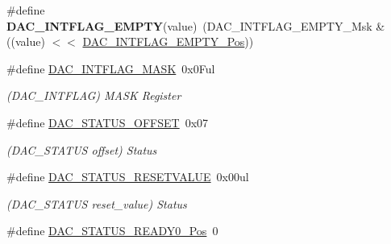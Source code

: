 \begin{DoxyCompactItemize}
\item 
\hypertarget{group___s_a_m_l21___d_a_c_ga7da99f63d5a2d03f99681a95f9b793a0}{}\#define {\bfseries D\+A\+C\+\_\+\+I\+N\+T\+F\+L\+A\+G\+\_\+\+E\+M\+P\+T\+Y}(value)~(D\+A\+C\+\_\+\+I\+N\+T\+F\+L\+A\+G\+\_\+\+E\+M\+P\+T\+Y\+\_\+\+Msk \& ((value) $<$$<$ \hyperlink{group___s_a_m_l21___d_a_c_ga0dac29b106d18582f439752a01102763}{D\+A\+C\+\_\+\+I\+N\+T\+F\+L\+A\+G\+\_\+\+E\+M\+P\+T\+Y\+\_\+\+Pos}))\label{group___s_a_m_l21___d_a_c_ga7da99f63d5a2d03f99681a95f9b793a0}

\item 
\hypertarget{group___s_a_m_l21___d_a_c_ga7610b49b2915578cf29db233149cf421}{}\#define \hyperlink{group___s_a_m_l21___d_a_c_ga7610b49b2915578cf29db233149cf421}{D\+A\+C\+\_\+\+I\+N\+T\+F\+L\+A\+G\+\_\+\+M\+A\+S\+K}~0x0\+Ful\label{group___s_a_m_l21___d_a_c_ga7610b49b2915578cf29db233149cf421}

\begin{DoxyCompactList}\small\item\em (D\+A\+C\+\_\+\+I\+N\+T\+F\+L\+A\+G) M\+A\+S\+K Register \end{DoxyCompactList}\item 
\hypertarget{group___s_a_m_l21___d_a_c_ga515f997330d2406b1230c8b83e7c5a6b}{}\#define \hyperlink{group___s_a_m_l21___d_a_c_ga515f997330d2406b1230c8b83e7c5a6b}{D\+A\+C\+\_\+\+S\+T\+A\+T\+U\+S\+\_\+\+O\+F\+F\+S\+E\+T}~0x07\label{group___s_a_m_l21___d_a_c_ga515f997330d2406b1230c8b83e7c5a6b}

\begin{DoxyCompactList}\small\item\em (D\+A\+C\+\_\+\+S\+T\+A\+T\+U\+S offset) Status \end{DoxyCompactList}\item 
\hypertarget{group___s_a_m_l21___d_a_c_ga114959003f1b29d6a60514c7e42781e3}{}\#define \hyperlink{group___s_a_m_l21___d_a_c_ga114959003f1b29d6a60514c7e42781e3}{D\+A\+C\+\_\+\+S\+T\+A\+T\+U\+S\+\_\+\+R\+E\+S\+E\+T\+V\+A\+L\+U\+E}~0x00ul\label{group___s_a_m_l21___d_a_c_ga114959003f1b29d6a60514c7e42781e3}

\begin{DoxyCompactList}\small\item\em (D\+A\+C\+\_\+\+S\+T\+A\+T\+U\+S reset\+\_\+value) Status \end{DoxyCompactList}\item 
\hypertarget{group___s_a_m_l21___d_a_c_ga4486c687c5a4ab1839b2a265c050585c}{}\#define \hyperlink{group___s_a_m_l21___d_a_c_ga4486c687c5a4ab1839b2a265c050585c}{D\+A\+C\+\_\+\+S\+T\+A\+T\+U\+S\+\_\+\+R\+E\+A\+D\+Y0\+\_\+\+Pos}~0\label{group___s_a_m_l21___d_a_c_ga4486c687c5a4ab1839b2a265c050585c}


\end{DoxyCompactItemize}
